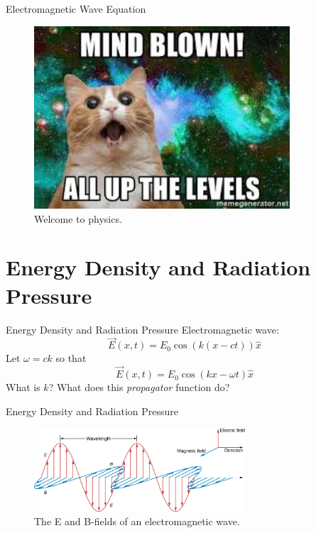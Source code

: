 \documentclass{beamer}
\begin{document}
\begin{frame}{Electromagnetic Wave Equation}
\begin{figure}
\centering
\includegraphics[width=0.85\textwidth]{figures/cat.jpeg}
\caption{\label{fig:cat} Welcome to physics.}
\end{figure}
\end{frame}

\section{Energy Density and Radiation Pressure}

\begin{frame}{Energy Density and Radiation Pressure}
Electromagnetic wave:
\begin{equation}
\vec{E}(x,t) = E_0 \cos(k(x-ct)) \hat{x}
\end{equation}
Let $\omega = ck$ so that
\begin{equation}
\vec{E}(x,t) = E_0 \cos(kx - \omega t) \hat{x}
\end{equation}
What is $k$? What does this \textit{propagator} function do?
\end{frame}

\begin{frame}{Energy Density and Radiation Pressure}
\begin{figure}
\centering
\includegraphics[width=0.7\textwidth]{figures/wave1.jpeg}
\caption{\label{fig:wave3} The E and B-fields of an electromagnetic wave.}
\end{figure}
\end{frame}
\end{document}
